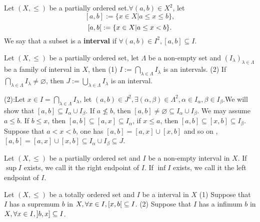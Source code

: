 \documentclass{book}
\numberwithin{equation}{section}
\begin{document}
\begin{definitionenv}
    Let $(X, \le)$ be a partially ordered set.$\forall (a, b)\in X^2$,  let 
    $$[a, b]:=\{x\in X|a\le x\le b \}, $$
     $$\interval[open right]{a}{b}:=\{x\in X|a\le x <b\}.$$ 
     We say that a subset is a \textbf{interval} if $\forall (a, b)\in I^2 , [a, b]\subseteq I$.
\end{definitionenv}
\begin{propositionenv}
    Let $(X, \le)$ be a partially ordered set,  let $\Lambda$ be a non-empty set and $(I_\lambda)_{\lambda\in \Lambda}$ be a family of interval in $X$,  then 
    \newline
    (1) $\displaystyle I:=\bigcap _{\lambda\in \Lambda}I_\lambda$ is an intervals.
    \newline
    (2) If $\displaystyle \bigcap _{\lambda\in \Lambda}I_\lambda\not=\varnothing $, then $\displaystyle J:=\bigcup_{\lambda\in \Lambda}I_\lambda$ is an interval.
\end{propositionenv}
\begin{proofenv}
    \quad 
    \newline
    (2):Let $x\in I=\bigcap _{\lambda\in \Lambda}I_\lambda$, let $(a, b)\in J^2, \exists (\alpha, \beta )\in \Lambda^2, \alpha\in I_\alpha, \beta\in I_\beta$.We will show that $[a, b]\subseteq I_\alpha\cup I_\beta$. If $a\not\le b $,  then $[a, b]\not =\varnothing\subseteq I_\alpha\cup I_\beta $. We may assume $a\le b $.
    \newline 
    If $b\le x$,  then $[a, b]\subseteq [a, x]\subseteq I_\alpha$,  if $x\le a $,  then $[a, b]\subseteq [x, b]\subseteq I_\beta$. Suppose that $a<x<b$,  one has $[a, b]=[a, x]\cup[x, b]$ and so on ,  $[a, b]=[a, x]\cup[x, b]\subseteq I_\alpha\cup I_\beta \subseteq J$.

\end{proofenv}
\begin{definitionenv}
    Let $(X, \le )$ be a partially ordered set and $I $ be a non-empty interval in $X$. 
    \newline
    If $\sup I$ exists,  we call it the right endpoint of $I$.
    \newline
    If $\inf I$ exists,  we call it the left endpoint of $I$.
\end{definitionenv}
\begin{propositionenv}
   Let $(X, \le )$ be a totally ordered set and $I $ be a interval in $X$ 
   \newline
   (1) Suppose that $I$ has a supremum $b$ in $X, \forall x\in I, \interval[open right]{x}{b}\subseteq I$.
   \newline
   (2) Suppose that $I$ has a infimum $b$ in $X, \forall x\in I, \interval[open left]{b}{x}\subseteq I$.
\end{propositionenv}
\end{document}
